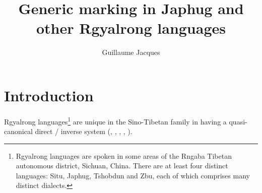 \documentclass[oldfontcommands,oneside,a4paper,11pt]{article}
\begin{document}
 
\linenumbers
\title{Generic marking in Japhug and other Rgyalrong languages }
\author{Guillaume Jacques}
\maketitle
 
\section{Introduction}
Rgyalrong languages\footnote{Rgyalrong languages are spoken in some areas of the Rngaba Tibetan autonomous district, Sichuan, China. There are at least four distinct languages: Situ, Japhug, Tshobdun and Zbu, each of which comprises many distinct dialects.} are unique in the Sino-Tibetan family in having a quasi-canonical direct / inverse system (\citealt{delancey81direction}, \citealt{jackson02rentongdengdi}, \citealt{jacques10inverse}, \citealt{gongxun14agreement}, \citealt{jacques14inverse}). 
\end{document}
